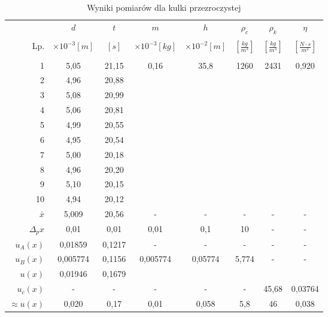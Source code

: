 \documentclass[polish, 11pt, a4paper]{article}
\begin{document}
		\begin{table}[H]
			\centering
			\caption{Wyniki pomiarów dla kulki przezroczystej}
			\begin{tabular}{|r|c|c|c|c|c|c|c|} \hline
				&	\(d\)	&	\(t\)	&	\(m\)	&	\(h\)	&	\(\rho_c\)	&	\(\rho_k\)	&	\(\eta\)	\\
				&&&&&&& \\[-1em]
				
				Lp.	&	\(\times{10^{-3} [m]}\)	&	\([s]\)	&	\(\times{10^{-3} [kg]}\)	&	\(\times{10^{-2} [m]}\)	&	\(\left[\frac{kg}{m^3}\right]\)	&	\(\left[\frac{kg}{m^3}\right]\)	&	\(\left[\frac{N\cdot s}{m^2}\right]\)	\\
				&&&&&&& \\[-1em]
				\hline
				1	&	5,05	&	21,15	&	\multirow{10}{*}{0,16}	&	\multirow{10}{*}{35,8}	&	\multirow{10}{*}{1260}	&	\multirow{10}{*}{2431}	&	\multirow{10}{*}{0,920}	\\\cline{1-3}
				2	&	4,96	&	20,88	&		&		&		&		&		\\\cline{1-3}
				3	&	5,08	&	20,99	&		&		&		&		&		\\\cline{1-3}
				4	&	5,06	&	20,81	&		&		&		&		&		\\\cline{1-3}
				5	&	4,99	&	20,55	&		&		&		&		&		\\\cline{1-3}
				6	&	4,95	&	20,54	&		&		&		&		&		\\\cline{1-3}
				7	&	5,00	&	20,18	&		&		&		&		&		\\\cline{1-3}
				8	&	4,96	&	20,20	&		&		&		&		&		\\\cline{1-3}
				9	&	5,10	&	20,15	&		&		&		&		&		\\\cline{1-3}
				10	&	4,94	&	20,12	&		&		&		&		&		\\\hline
				\(\bar{x}\)	&	5,009	&	20,56	&	-	&	-	&	-	&	-	&	-	\\\hline
				\(\Delta{_px}\)	&	0,01	&	0,01	&	0,01	&	0,1	&	10	&	-	&	-	\\\hline
				\(u_A(x)\)	&	0,01859	&	0,1217	&	-	&	-	&	-	&	-	&	-	\\\hline
				\(u_B(x)\)	&	0,005774	&	0,1156	&	\multirow{2}{*}{0,005774}	&	\multirow{2}{*}{0,05774}	&	\multirow{2}{*}{5,774}	&	\multirow{2}{*}{-}	&	\multirow{2}{*}{-}	\\\cline{1-3}
				\(u(x)\)	&	0,01946	&	0,1679	&		&		&		&		&		\\\hline
				\(u_c(x)\)	&	-	&	-	&	-	&	-	&	-	&	45,68	&	0,03764	\\\hline
				\(\approx{u(x)}\)	&	0,020	&	0,17	&	0,01	&	0,058	&	5,8	&	46	&	0,038	\\\hline
			\end{tabular}
		\end{table}
	\newpage
\end{document}
